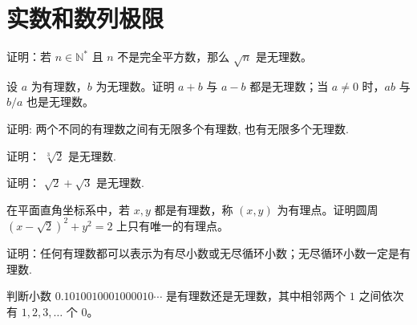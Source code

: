 \renewcommand{\thesection}{\arabic{section}}\renewcommand{\theHsection}{chapter.\arabic{section}}\setcounter{section}{0}\section{实数和数列极限}
\noindent\begin{minipage}{\textwidth}
证明：若  $ n \in \mathbb{N}^* $ 且  $ n $ 不是完全平方数，那么  $ \sqrt{n} $ 是无理数。
\end{minipage}\par\vfill
\noindent\begin{minipage}{\textwidth}
设 $a$ 为有理数，$b$ 为无理数。证明 $a+b$ 与 $a-b$ 都是无理数；当 $a\ne0$ 时，$ab$ 与 $b/a$ 也是无理数。
\end{minipage}\par\vfill
\noindent\begin{minipage}{\textwidth}
证明: 两个不同的有理数之间有无限多个有理数, 也有无限多个无理数.
\end{minipage}\par\vfill
\newpage
\noindent\begin{minipage}{\textwidth}
证明： $ \sqrt[3]{2} $ 是无理数.
\end{minipage}\par\vfill
\noindent\begin{minipage}{\textwidth}
证明： $ \sqrt{2} + \sqrt{3} $ 是无理数.
\end{minipage}\par\vfill
\noindent\begin{minipage}{\textwidth}
在平面直角坐标系中，若 $x,y$ 都是有理数，称 $(x,y)$ 为有理点。证明圆周 $(x-\sqrt2)^2+y^2=2$ 上只有唯一的有理点。
\end{minipage}\par\vfill
\newpage
\noindent\begin{minipage}{\textwidth}
证明：任何有理数都可以表示为有尽小数或无尽循环小数；无尽循环小数一定是有理数.
\end{minipage}\par\vfill
\noindent\begin{minipage}{\textwidth}
判断小数 $0.1010010001000010\cdots$ 是有理数还是无理数，其中相邻两个 $1$ 之间依次有 $1,2,3,\ldots$ 个 $0$。
\end{minipage}\par\vfill
